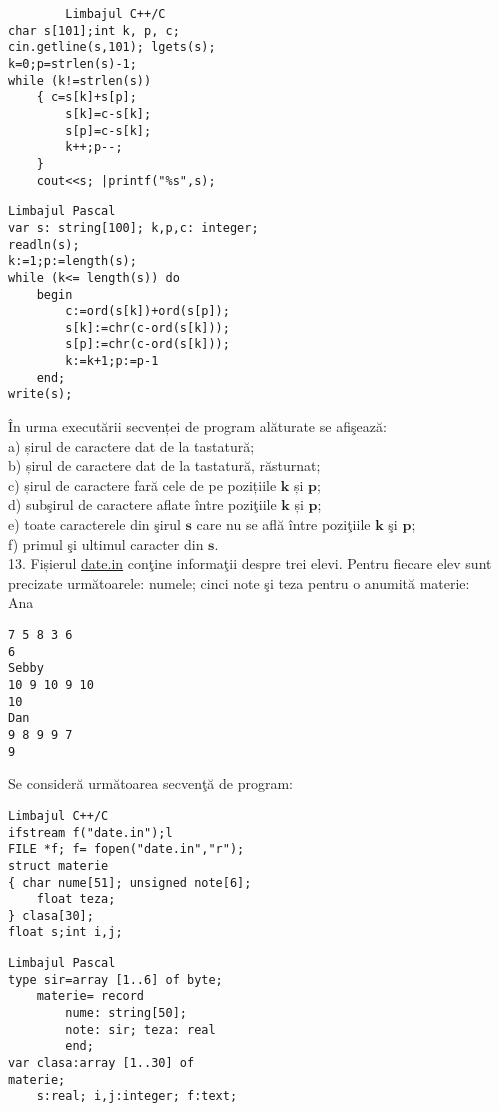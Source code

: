 \begin{verbatim}
        Limbajul C++/C
char s[101];int k, p, c;
cin.getline(s,101); lgets(s);
k=0;p=strlen(s)-1;
while (k!=strlen(s))
    { c=s[k]+s[p];
        s[k]=c-s[k];
        s[p]=c-s[k];
        k++;p--;
    }
    cout<<s; |printf("%s",s);
\end{verbatim}

\begin{verbatim}
Limbajul Pascal
var s: string[100]; k,p,c: integer;
readln(s);
k:=1;p:=length(s);
while (k<= length(s)) do
    begin
        c:=ord(s[k])+ord(s[p]);
        s[k]:=chr(c-ord(s[k]));
        s[p]:=chr(c-ord(s[k]));
        k:=k+1;p:=p-1
    end;
write(s);
\end{verbatim}

În urma executării secvenței de program alăturate se afişează:\\
a) șirul de caractere dat de la tastatură;\\
b) șirul de caractere dat de la tastatură, răsturnat;\\
c) șirul de caractere fară cele de pe pozițiile $\mathbf{k}$ și $\mathbf{p}$;\\
d) subşirul de caractere aflate între poziţiile $\mathbf{k}$ și $\mathbf{p}$;\\
e) toate caracterele din şirul $\mathbf{s}$ care nu se află între poziţiile $\mathbf{k}$ şi $\mathbf{p}$;\\
f) primul şi ultimul caracter din $\mathbf{s}$.\\
13. Fișierul \href{http://date.in}{date.in} conţine informaţii despre trei elevi. Pentru fiecare elev sunt precizate următoarele: numele; cinci note şi teza pentru o anumită materie:\\
Ana

\begin{verbatim}
7 5 8 3 6
6
Sebby
10 9 10 9 10
10
Dan
9 8 9 9 7
9
\end{verbatim}

Se consideră următoarea secvenţă de program:

\begin{verbatim}
Limbajul C++/C
ifstream f("date.in");l
FILE *f; f= fopen("date.in","r");
struct materie
{ char nume[51]; unsigned note[6];
    float teza;
} clasa[30];
float s;int i,j;
\end{verbatim}

\begin{verbatim}
Limbajul Pascal
type sir=array [1..6] of byte;
    materie= record
        nume: string[50];
        note: sir; teza: real
        end;
var clasa:array [1..30] of
materie;
    s:real; i,j:integer; f:text;
\end{verbatim}

